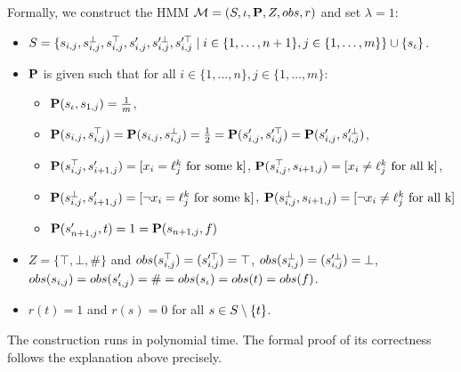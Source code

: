 \documentclass[runningheads]{llncs}
\newcommand{\indicator}[1]{[#1]}
\newcommand{\Obs}{Z}
\begin{document}
Formally, we construct the HMM $\mc = (\Sts,\init, \ptrans, \Obs, \obsf, r)$ and set $\lambda = 1$:
\begin{itemize}
    \item
          $S = \{ s_{i,j}, s_{i,j}^\bot, s_{i,j}^\top,
              s_{i,j}', s_{i,j}'^\bot, s_{i,j}'^\top
              \mid i \in \{1, \dots, n+1 \},  j \in \{ 1, \dots, m \} \} \cup \{ s_\iota \}$.
    \item $\mathbf{P}$ is given such that for all $i \in \{1,\dots, n\}, j \in \{1, \dots, m\}$:
          \begin{itemize}
              \item  $\mathbf{P}(s_\iota,s_{1,j}) = \frac{1}{m}$,
              \item  $\mathbf{P}(s_{i,j},s_{i,j}^\top) = \mathbf{P}(s_{i,j},s_{i,j}^\bot) = \frac{1}{2}= \mathbf{P}(s'_{i,j},s_{i,j}'^\top) = \mathbf{P}(s_{i,j}',s_{i,j}'^
                        \bot)$,
              \item $\ptrans(s_{i,j}^\top,s'_{i+1,j}) = \indicator{x_i = \ell_j^k \text{ for some k}}$, $\ptrans(s_{i,j}^\top,s_{i+1,j}) = \indicator{x_i \neq \ell_j^k \text{ for all k}}$,
              \item $\ptrans(s_{i,j}^\bot,s'_{i+1,j}) = \indicator{\neg x_i = \ell_j^k \text{ for some k}}$, $\ptrans(s_{i,j}^\bot,s_{i+1,j}) = \indicator{\neg x_i \neq \ell_j^k \text{ for all k}}$
              \item $\mathbf{P}(s'_{n+1,j}, t) = 1 = \mathbf{P}(s_{n+1,j}, f)$
          \end{itemize}
    \item $\Obs = \{\top, \bot, \#\}$ and ${obs}(s_{i,j}^\top) = (s_{i,j}'^\top) = \top$,
          ${obs}(s_{i,j}^\bot) = (s_{i,j}'^\bot) = \bot$,
          ${obs}(s_{i,j}) = {obs}(s'_{i,j}) = \# = {obs}(s_\iota) = {obs}(t) = {obs}(f)$.
    \item $r(t) = 1$ and $r(s) = 0$ for all $s \in S \setminus \{ t\}$.
\end{itemize}
The construction runs in polynomial time. The formal proof of its correctness follows the explanation above precisely.
\end{document}
